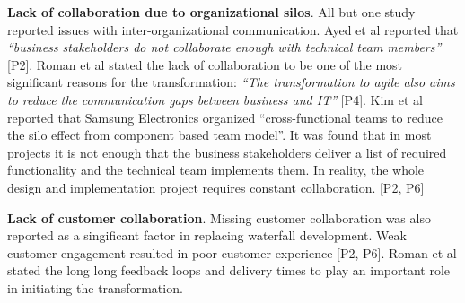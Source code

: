 {\bfseries Lack of collaboration due to organizational silos}. All but
one study reported issues with inter-organizational communication. Ayed
et al reported that \textit{``business stakeholders do not collaborate
enough with technical team members''} [P2]. Roman et al stated the
lack of collaboration to be one of the most significant reasons for
the transformation: \textit{``The transformation to agile also aims
to reduce the communication gaps between business and IT''} [P4]. Kim
et al reported that Samsung Electronics organized ``cross-functional
teams to reduce the silo effect from component based team model''. It
was found that in most projects it is not enough that the business
stakeholders deliver a list of required functionality and the technical
team implements them. In reality, the whole design and implementation
project requires constant collaboration. [P2, P6]

{\bfseries Lack of customer collaboration}. Missing customer
collaboration was also reported as a singificant factor in replacing
waterfall development. Weak customer engagement resulted in poor
customer experience [P2, P6]. Roman et al stated the long long feedback
loops and delivery times to play an important role in initiating the
transformation.
